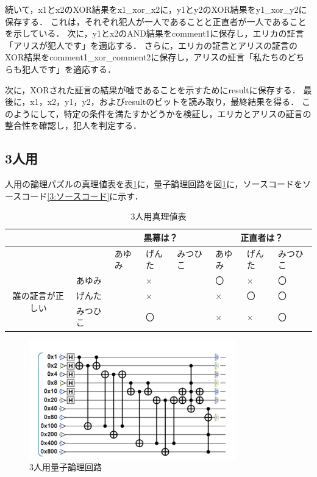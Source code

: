 \documentclass[titlepage,a4paper]{jsarticle}
\begin{document}
続いて，x1とx2のXOR結果をx1\_xor\_x2に，y1とy2のXOR結果をy1\_xor\_y2に保存する．
これは，それぞれ犯人が一人であることと正直者が一人であることを示している．
次に，y1とx2のAND結果をcomment1に保存し，エリカの証言「アリスが犯人です」を適応する．
さらに，エリカの証言とアリスの証言のXOR結果をcomment1\_xor\_comment2に保存し，アリスの証言「私たちのどちらも犯人です」を適応する．

次に，XORされた証言の結果が嘘であることを示すためにresultに保存する．
最後に，x1，x2，y1，y2，およびresultのビットを読み取り，最終結果を得る．
このようにして，特定の条件を満たすかどうかを検証し，エリカとアリスの証言の整合性を確認し，犯人を判定する．

\subsection{3人用}
人用の論理パズルの真理値表を表\ref{3:真理値}に，量子論理回路を図\ref{3:回路}に，ソースコードをソースコード\ref{3:ソースコード}に示す．
\begin{table}[H]
  \centering
  \caption{3人用真理値表}
  \label{3:真理値}
  \begin{tabular}{c|l|lll|lll}
    \multicolumn{1}{l}{}      &      & \multicolumn{3}{c|}{黒幕は？} & \multicolumn{3}{c}{正直者は？}                           \\\hline
    \multicolumn{1}{l}{}      &      & あゆみ                       & げんた                       & みつひこ & あゆみ & げんた & みつひこ \\\hline
    \multirow{3}{*}{誰の証言が正しい} & あゆみ  &                           & ×                         &      & 〇   & ×   & 〇    \\
                              & げんた  &                           & ×                         &      & ×   & 〇   & 〇    \\
                              & みつひこ &                           & 〇                         &      & ×   & ×   & 〇    \\\hline
  \end{tabular}
\end{table}

\begin{figure}[H]
  \centering
  \includegraphics[width=0.8\textwidth]{img/3_qc.png}
  \caption{3人用量子論理回路}
  \label{3:回路}
\end{figure}
\end{document}
